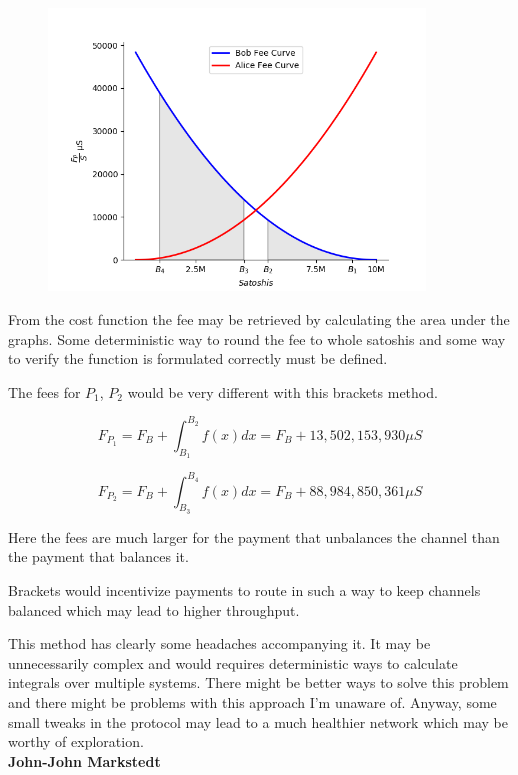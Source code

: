 \begin{figure}[!htb]
	\vspace{-0.7cm}
	\centering
	\includegraphics[width=10cm]{images/fee_scheme.png}
	\label{fig:xt_nodes}
\end{figure}
\newpage

From the cost function the fee may be retrieved by calculating the area under the graphs. Some deterministic way to round the fee to whole satoshis and some way to verify the function is formulated correctly must be defined. 

The fees for $P_1$, $P_2$ would be very different with this brackets method.

\[ F_{P_1} = F_{B} + \int_{B_1}^{B_2} f(x) dx = F_B + 13,502,153,930 \mu S \] 

\[ F_{P_2} = F_{B} + \int_{B_3}^{B_4} f(x) dx  = F_B + 88,984,850,361 \mu S \]
 
Here the fees are much larger for the payment that unbalances the channel than the payment that balances it. 

Brackets would incentivize payments to route in such a way to keep channels balanced which may lead to higher throughput. %

This method has clearly some headaches accompanying it. It may be unnecessarily complex and would requires deterministic ways to calculate integrals over multiple systems. There might be better ways to solve this problem and there might be problems with this approach I'm unaware of. Anyway, some small tweaks in the protocol may lead to a much healthier network which may be worthy of exploration.\\

\textbf{John-John Markstedt}

